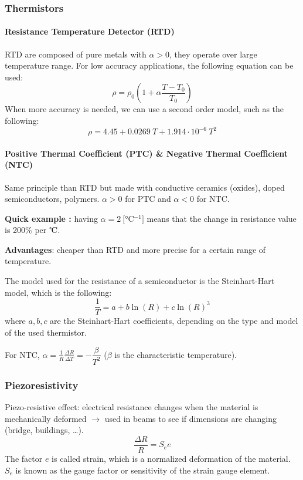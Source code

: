\subsubsection{Thermistors}

\paragraph{Resistance Temperature Detector (RTD)}
RTD are composed of pure metals with $\alpha > 0$, they operate over large temperature range. For low accuracy applications, the following equation can be used:
\[
    \rho = \rho_0 \left(1 + \alpha \frac{T - T_0}{T_0}\right)
\]
When more accuracy is needed, we can use a second order model, such as the following:
\[
    \rho = 4.45 + 0.0269\:T + 1.914\cdot 10^{-6}\:T^2
\]

\paragraph{Positive Thermal Coefficient (PTC) \& Negative Thermal Coefficient (NTC)}

Same principle than RTD but made with conductive ceramics (oxides),
doped semiconductors, polymers.
$\alpha > 0$ for PTC and $\alpha < 0 $ for NTC. 

\textbf{Quick example :} having $\alpha = \SI{2}{[\celsius^{-1}]}$ means that the change in resistance value is 200\% per $\celsius$.   

\textbf{Advantages}: cheaper than RTD and more precise for a certain range of temperature.

The model used for the resistance of a semiconductor is the Steinhart-Hart model, which is the following:
\[
    \dfrac{1}{T} = a + b \ln(R) + c\ln(R)^3
\]
where $a,b,c$ are the Steinhart-Hart coefficients, depending on the type and model of the used thermistor. 

For NTC, $\alpha = \frac{1}{R} \frac{\Delta R}{\Delta T} = - \dfrac{\beta}{T^2}$ ($\beta$ is the characteristic temperature).

\subsubsection{Piezoresistivity}

Piezo-resistive effect: electrical resistance changes when the material is mechanically deformed $\rightarrow$ used in beams to see if dimensions are changing (bridge, buildings, \dots).
$$ \frac{\Delta R}{R} = S_e e $$
The factor $e$ is called strain, which is a
normalized deformation of the material. $S_e$ is known as the gauge factor or sensitivity of the strain gauge element.

